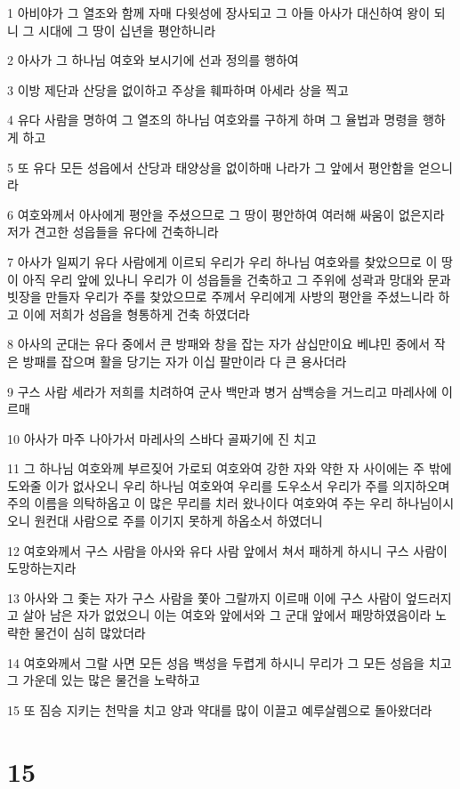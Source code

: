 \par 1 아비야가 그 열조와 함께 자매 다윗성에 장사되고 그 아들 아사가 대신하여 왕이 되니 그 시대에 그 땅이 십년을 평안하니라
\par 2 아사가 그 하나님 여호와 보시기에 선과 정의를 행하여
\par 3 이방 제단과 산당을 없이하고 주상을 훼파하며 아세라 상을 찍고
\par 4 유다 사람을 명하여 그 열조의 하나님 여호와를 구하게 하며 그 율법과 명령을 행하게 하고
\par 5 또 유다 모든 성읍에서 산당과 태양상을 없이하매 나라가 그 앞에서 평안함을 얻으니라
\par 6 여호와께서 아사에게 평안을 주셨으므로 그 땅이 평안하여 여러해 싸움이 없은지라 저가 견고한 성읍들을 유다에 건축하니라
\par 7 아사가 일찌기 유다 사람에게 이르되 우리가 우리 하나님 여호와를 찾았으므로 이 땅이 아직 우리 앞에 있나니 우리가 이 성읍들을 건축하고 그 주위에 성곽과 망대와 문과 빗장을 만들자 우리가 주를 찾았으므로 주께서 우리에게 사방의 평안을 주셨느니라 하고 이에 저희가 성읍을 형통하게 건축 하였더라
\par 8 아사의 군대는 유다 중에서 큰 방패와 창을 잡는 자가 삼십만이요 베냐민 중에서 작은 방패를 잡으며 활을 당기는 자가 이십 팔만이라 다 큰 용사더라
\par 9 구스 사람 세라가 저희를 치려하여 군사 백만과 병거 삼백승을 거느리고 마레사에 이르매
\par 10 아사가 마주 나아가서 마레사의 스바다 골짜기에 진 치고
\par 11 그 하나님 여호와께 부르짖어 가로되 여호와여 강한 자와 약한 자 사이에는 주 밖에 도와줄 이가 없사오니 우리 하나님 여호와여 우리를 도우소서 우리가 주를 의지하오며 주의 이름을 의탁하옵고 이 많은 무리를 치러 왔나이다 여호와여 주는 우리 하나님이시오니 원컨대 사람으로 주를 이기지 못하게 하옵소서 하였더니
\par 12 여호와께서 구스 사람을 아사와 유다 사람 앞에서 쳐서 패하게 하시니 구스 사람이 도망하는지라
\par 13 아사와 그 좇는 자가 구스 사람을 쫓아 그랄까지 이르매 이에 구스 사람이 엎드러지고 살아 남은 자가 없었으니 이는 여호와 앞에서와 그 군대 앞에서 패망하였음이라 노략한 물건이 심히 많았더라
\par 14 여호와께서 그랄 사면 모든 성읍 백성을 두렵게 하시니 무리가 그 모든 성읍을 치고 그 가운데 있는 많은 물건을 노략하고
\par 15 또 짐승 지키는 천막을 치고 양과 약대를 많이 이끌고 예루살렘으로 돌아왔더라

\chapter{15}

